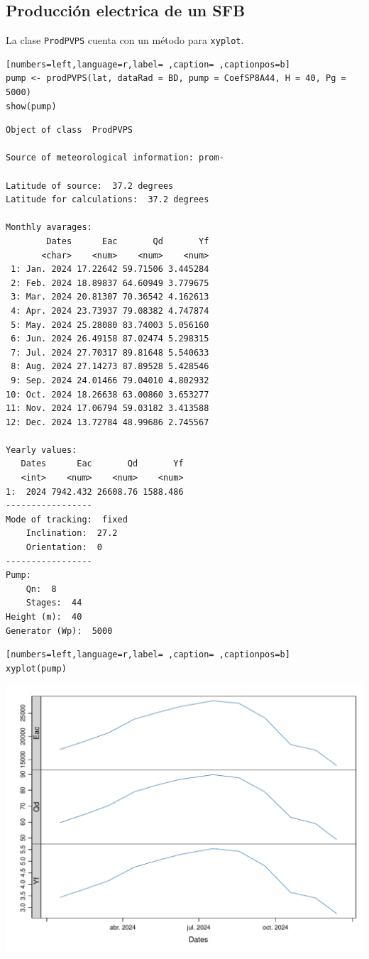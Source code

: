 \subsection{Producción electrica de un SFB}
\label{sec:orgb9d8a8f}
La clase \texttt{ProdPVPS} cuenta con un método para \texttt{xyplot}.
\begin{lstlisting}[numbers=left,language=r,label= ,caption= ,captionpos=b]
pump <- prodPVPS(lat, dataRad = BD, pump = CoefSP8A44, H = 40, Pg = 5000)
show(pump)
\end{lstlisting}

\begin{verbatim}
Object of class  ProdPVPS 

Source of meteorological information: prom- 

Latitude of source:  37.2 degrees
Latitude for calculations:  37.2 degrees

Monthly avarages:
        Dates      Eac       Qd       Yf
       <char>    <num>    <num>    <num>
 1: Jan. 2024 17.22642 59.71506 3.445284
 2: Feb. 2024 18.89837 64.60949 3.779675
 3: Mar. 2024 20.81307 70.36542 4.162613
 4: Apr. 2024 23.73937 79.08382 4.747874
 5: May. 2024 25.28080 83.74003 5.056160
 6: Jun. 2024 26.49158 87.02474 5.298315
 7: Jul. 2024 27.70317 89.81648 5.540633
 8: Aug. 2024 27.14273 87.89528 5.428546
 9: Sep. 2024 24.01466 79.04010 4.802932
10: Oct. 2024 18.26638 63.00860 3.653277
11: Nov. 2024 17.06794 59.03182 3.413588
12: Dec. 2024 13.72784 48.99686 2.745567

Yearly values:
   Dates      Eac       Qd       Yf
   <int>    <num>    <num>    <num>
1:  2024 7942.432 26608.76 1588.486
-----------------
Mode of tracking:  fixed 
    Inclination:  27.2 
    Orientation:  0 
-----------------
Pump:
    Qn:  8 
    Stages:  44 
Height (m):  40 
Generator (Wp):  5000
\end{verbatim}

\begin{lstlisting}[numbers=left,language=r,label= ,caption= ,captionpos=b]
xyplot(pump)
\end{lstlisting}

\begin{center}
\includegraphics[width=.9\linewidth]{figuras/codigo-prodpvps.pdf}
\end{center}

